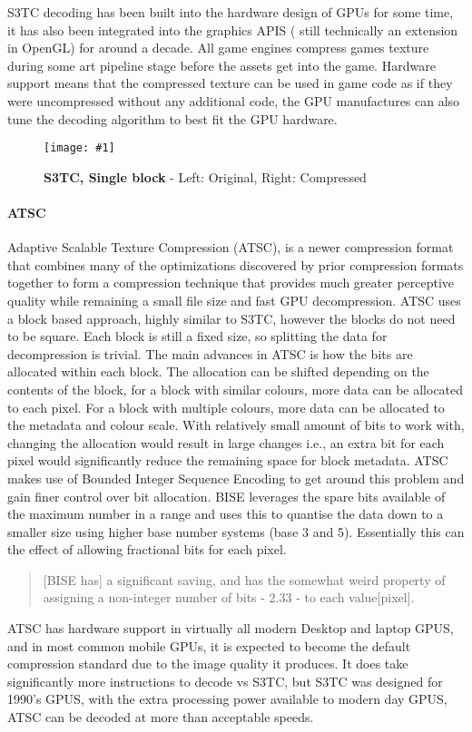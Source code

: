 \documentclass[12pt,a4paper]{article}
\newcommand{\figuremacroF}[4]{
	\begin{figure*}[t] %
		\centering
		\texttt{[image: \#1]}
		\caption[#2]{\textbf{#2} - #3}
		\label{fig:#1}
	\end{figure*}
}
\begin{document}
S3TC decoding has been built into the hardware design of GPUs for some time, it has also been integrated into the graphics APIS ( still technically an extension in OpenGL) for around a decade. All game engines compress games texture during some art pipeline stage before the assets get into the game. Hardware support means that the compressed texture can be used in game code as if they were uncompressed without any additional code, the GPU manufactures can also tune the decoding algorithm to best fit the GPU hardware. 

	\figuremacroF
	{dxt}
	{S3TC, Single block}
	{Left: Original, Right: Compressed \cite{dxtimg}}
	{0.5}
	
\paragraph{ATSC}
Adaptive Scalable Texture Compression (ATSC), is a newer compression format that combines many of the optimizations discovered by prior compression formats together to form a compression technique that provides much greater perceptive quality while remaining a small file size and fast GPU decompression. ATSC uses a block based approach, highly similar to S3TC, however the blocks do not need to be square. Each block is still a fixed size, so splitting the data for decompression is trivial. The main advances in ATSC is how the bits are allocated within each block. The allocation can be shifted depending on the contents of the block, for a block with similar colours, more data can be allocated to each pixel. For a block with multiple colours, more data can be allocated to the metadata and colour scale. With relatively small amount of bits to work with, changing the allocation would result in large changes i.e., an extra bit for each pixel would significantly reduce the remaining space for block metadata. ATSC makes use of Bounded Integer Sequence Encoding to get around this problem and gain finer control over bit allocation. BISE leverages the spare bits available of the maximum number in a range and uses this to quantise the data down to a smaller size using higher base number systems (base 3 and 5). Essentially this can the effect of allowing fractional bits for each pixel.


\blockquote[\cite{astsinfo}]{[BISE has] a significant saving, and has the somewhat weird property of assigning a non-integer number of bits - 2.33 - to each value[pixel].}

ATSC has hardware support in virtually all modern Desktop and laptop GPUS, and in most common mobile GPUs, it is expected to become the default compression standard due to the image quality it produces. It does take significantly more instructions to decode vs S3TC, but S3TC was designed for 1990’s GPUS, with the extra processing power available to modern day GPUS, ATSC can be decoded at more than acceptable speeds. 
\end{document}
